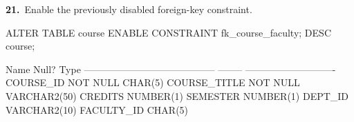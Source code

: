 
\noindent\begin{minipage}{\linewidth}
\begingroup{}
{\fontsize{14}{17}\selectfont\textbf{21.}}\ Enable the previously disabled foreign-key constraint.\par
\endgroup\vspace{12pt}


\begin{sqlcode}
ALTER TABLE course ENABLE CONSTRAINT fk_course_faculty;
DESC course;
\end{sqlcode}

\vspace{18pt}


\begin{sqlout}
 Name                                      Null?    Type
 ----------------------------------------- -------- ----------------------------
 COURSE_ID                                 NOT NULL CHAR(5)
 COURSE_TITLE                              NOT NULL VARCHAR2(50)
 CREDITS                                            NUMBER(1)
 SEMESTER                                           NUMBER(1)
 DEPT_ID                                            VARCHAR2(10)
 FACULTY_ID                                         CHAR(5)
\end{sqlout}
\end{minipage}\par\vspace{30pt}

